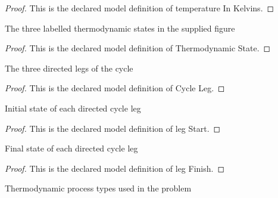 \begin{proof}
  This is the declared model definition of temperature In Kelvins.
\end{proof}
\begin{definition}
  \label{def:physics:phyx-mini-0351:phyxminiproblems-problemphyxmini0351-thermodynamicstate}
  The three labelled thermodynamic states in the supplied figure
\end{definition}
\begin{proof}
  This is the declared model definition of Thermodynamic State.
\end{proof}
\begin{definition}
  \label{def:physics:phyx-mini-0351:phyxminiproblems-problemphyxmini0351-cycleleg}
  The three directed legs of the cycle
\end{definition}
\begin{proof}
  This is the declared model definition of Cycle Leg.
\end{proof}
\begin{definition}
  \label{def:physics:phyx-mini-0351:phyxminiproblems-problemphyxmini0351-legstart}
  Initial state of each directed cycle leg
\end{definition}
\begin{proof}
  This is the declared model definition of leg Start.
\end{proof}
\begin{definition}
  \label{def:physics:phyx-mini-0351:phyxminiproblems-problemphyxmini0351-legfinish}
  Final state of each directed cycle leg
\end{definition}
\begin{proof}
  This is the declared model definition of leg Finish.
\end{proof}
\begin{definition}
  \label{def:physics:phyx-mini-0351:phyxminiproblems-problemphyxmini0351-thermodynamicprocesskind}
  Thermodynamic process types used in the problem
\end{definition}
